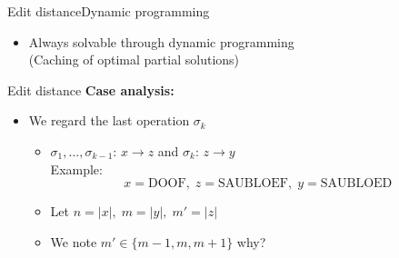 \begin{frame}{Edit distance}{Dynamic programming}
\begin{itemize}
\begin{itemize}
          \begin{figure}[!h]
          \end{figure}
      \end{itemize}
    \item
      Always solvable through dynamic programming\\
      (Caching of optimal partial solutions)
  \end{itemize}
\end{frame}


\begin{frame}{Edit distance}
  \textbf{Case analysis:}
  \begin{itemize}
    \item
      We regard the last operation $\sigma_k$
      \begin{itemize}
        \item
          $\sigma_1, \dots, \sigma_{k-1}$:
          {\color{Mittel-Blau}$x \rightarrow z$} and $\sigma_k$:
          {\color{Mittel-Blau}$z \rightarrow y$}\\
          Example:
          \begin{displaymath}
            x = \mathrm{DOOF}, \;
            z = \mathrm{SAUBLOEF}, \;
            y = \mathrm{SAUBLOED}
          \end{displaymath}
        \item
          Let $n = \vert x \vert, \; m = \vert y \vert, \; m' = \vert z \vert$
        \item
          We note $m' \in \{m - 1, m, m + 1\}$
          \hspace{1.5em}
          {\color{gray}why?}
      \end{itemize}
  \end{itemize}
\end{frame}


